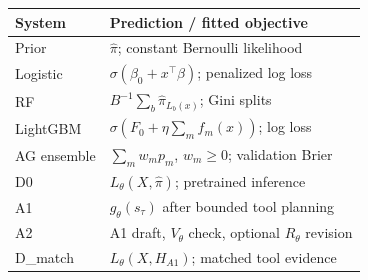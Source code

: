 \begin{tabular}{@{}lp{}@{}}
\toprule
System & Prediction / fitted objective \\
\midrule
Prior & $\hat\pi$; constant Bernoulli likelihood \\
Logistic & $\sigma(\beta_0+x^\top\beta)$; penalized log loss \\
RF & $B^{-1}\sum_b\hat\pi_{L_b(x)}$; Gini splits \\
LightGBM & $\sigma(F_0+\eta\sum_m f_m(x))$; log loss \\
AG ensemble & $\sum_mw_mp_m$, $w_m\ge0$; validation Brier \\
D0 & $L_\theta(X,\hat\pi)$; pretrained inference \\
A1 & $g_\theta(s_\tau)$ after bounded tool planning \\
A2 & A1 draft, $V_\theta$ check, optional $R_\theta$ revision \\
D\_match & $L_\theta(X,H_{A1})$; matched tool evidence \\
\bottomrule
\end{tabular}
